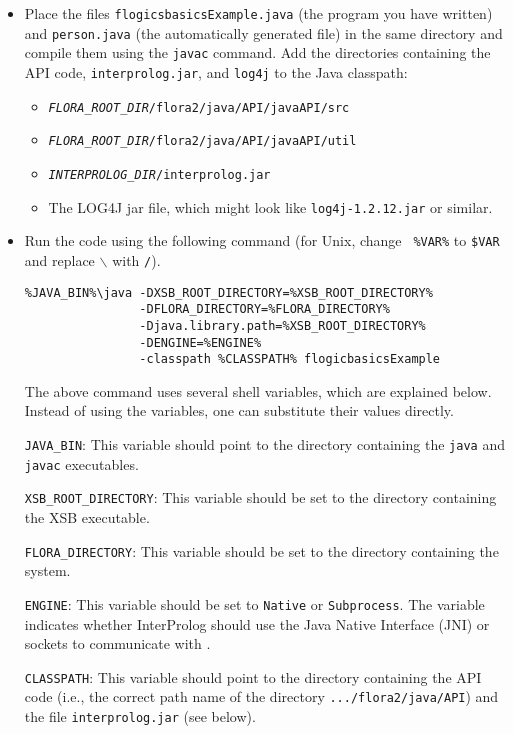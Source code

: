 \begin{itemize}
\item Place the files {\tt flogicsbasicsExample.java} (the program you have
  written) and {\tt person.java} (the automatically generated file)
in the same directory and compile them using the {\tt javac}  command. Add
the directories containing the API code, 
{\tt interprolog.jar}, and \texttt{log4j}  to the Java classpath:
\begin{itemize}
\item  \texttt{\textit{FLORA\_ROOT\_DIR}/flora2/java/API/javaAPI/src} 
\item  \texttt{\textit{FLORA\_ROOT\_DIR}/flora2/java/API/javaAPI/util}
\item  \texttt{\textit{INTERPROLOG\_DIR}/interprolog.jar}
\item  The LOG4J jar file, which might look like \texttt{log4j-1.2.12.jar}
  or similar. 
\end{itemize}


\item Run the code using the following command (for Unix, change {\tt
    \%VAR\%} to {\tt \$VAR} and replace $\backslash$ with {\tt /}).
\begin{verbatim}
%JAVA_BIN%\java -DXSB_ROOT_DIRECTORY=%XSB_ROOT_DIRECTORY%
                -DFLORA_DIRECTORY=%FLORA_DIRECTORY%
                -Djava.library.path=%XSB_ROOT_DIRECTORY%
                -DENGINE=%ENGINE%
                -classpath %CLASSPATH% flogicbasicsExample
\end{verbatim}

  The above command uses several shell variables, which are explained below.
  Instead of using the variables, one can substitute their values directly.

{\tt JAVA\_BIN}: This variable should point to the directory
containing the {\tt java}  and {\tt javac}  executables.

{\tt XSB\_ROOT\_DIRECTORY}: This variable should be set to the
directory containing the XSB executable.

{\tt FLORA\_DIRECTORY}: This variable should be set to the directory
containing the \FLORA system.

{\tt ENGINE}: This variable should be set to
{\tt Native} or  {\tt Subprocess}. The variable indicates whether InterProlog
should use the Java Native Interface (JNI) or sockets to communicate with \FLORA.

{\tt CLASSPATH}: This variable should point to the directory
containing the API code (i.e., the correct path name of the
directory {\tt .../flora2/java/API})  and the file {\tt interprolog.jar}
(see below).

\end{itemize}

